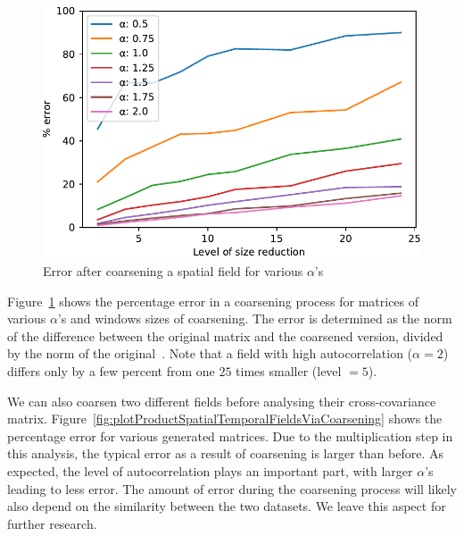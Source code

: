\documentclass[sigconf]{acmart}
\begin{document}
\begin{figure}[h]
\begin{center}
\includegraphics[width=0.8\columnwidth]{Results/plotSingleSpatialFieldViaCoarsening.pdf}
\caption[Error after coarsening a spatial field]{Error after coarsening a spatial field for various $\alpha$'s}
\label{fig:plotSingleSpatialFieldViaCoarsening}
\end{center}
\end{figure}
Figure~\ref{fig:plotSingleSpatialFieldViaCoarsening} shows the percentage error in a coarsening process for matrices of various $\alpha$'s and windows sizes of coarsening. The error is determined as the norm of the difference between the original matrix and the coarsened version, divided by the norm of the original~\cite{Bogaardt2018}. Note that a field with high autocorrelation ($\alpha=2$) differs only by a few percent from one $25$ times smaller (level $= 5$).

We can also coarsen two different fields before analysing their cross-covariance matrix. Figure~\ref{fig:plotProductSpatialTemporalFieldsViaCoarsening} shows the percentage error for various generated matrices. Due to the multiplication step in this analysis, the typical error as a result of coarsening is larger than before. As expected, the level of autocorrelation plays an important part, with larger $\alpha$'s leading to less error. The amount of error during the coarsening process will likely also depend on the similarity between the two datasets. We leave this aspect for further research.
\end{document}
